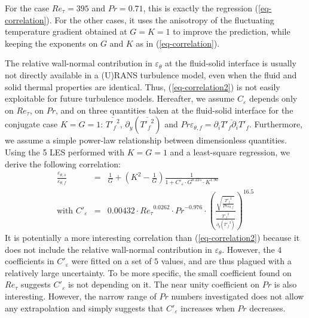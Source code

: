 \documentclass{svjour3}                     %
\begin{document}
For the case $Re_\tau = 395$ and $Pr = 0.71$, this is exactly the regression (\ref{eq-correlation}).
For the other cases, it uses the anisotropy of the fluctuating temperature gradient obtained at $G=K=1$ to improve the prediction, while keeping the exponents on $G$ and $K$ as in (\ref{eq-correlation}).

The relative wall-normal contribution in $\varepsilon_\theta$ at the fluid-solid interface is usually not directly available in a (U)RANS turbulence model, even when the fluid and solid thermal properties are identical.
Thus, (\ref{eq-correlation2}) is not easily exploitable for future turbulence models.
Hereafter, we assume $C_\varepsilon$ depends only on $Re_\tau$, on $Pr$, and on three quantities taken at the fluid-solid interface for the conjugate case $K=G=1$: $\overline{{T'_f}^2}$, $\partial_y \left( \overline{{T'_f}^2} \right)$ and $Pr \varepsilon_{\theta,f} = \overline{\partial_i T'_f \partial_i T'_f}$.
Furthermore, we assume a simple power-law relationship between dimensionless quantities.
Using the 5 LES performed with $K=G=1$ and a least-square regression, we derive the following correlation:
\begin{eqnarray}
\frac{\varepsilon_{\theta,s}}{\varepsilon_{\theta,f}} & = & \frac{1}{G} + \left( K^2 - \frac{1}{G} \right) \frac{1}{1+C'_\varepsilon \cdot G^{0.225} \cdot K ^{1.90}} \label{eq-correlation3} \\
\mbox{with } C'_\varepsilon & = & 0.00432 \cdot {Re_\tau}^{0.0262} \cdot {Pr}^{-0.976} \cdot \left( \frac{\sqrt{\frac{\overline{{T'_f}^2}}{Pr \varepsilon_{\theta,f}}}}{\frac{\overline{{T'_f}^2}}{\partial_y \left( \overline{{T'_f}^2} \right)}} \right)^{16.5} \nonumber
\end{eqnarray}
It is potentially a more interesting correlation than (\ref{eq-correlation2}) because it does not include the relative wall-normal contribution in $\varepsilon_\theta$.
However, the $4$ coefficients in $C'_\varepsilon$ were fitted on a set of $5$ values, and are thus plagued with a relatively large uncertainty.
To be more specific, the small coefficient found on $Re_\tau$ suggests $C'_\varepsilon$ is not depending on it.
The near unity coefficient on $Pr$ is also interesting.
However, the narrow range of $Pr$ numbers investigated does not allow any extrapolation and simply suggests that $C'_\varepsilon$ increases when $Pr$ decreases.
\end{document}
